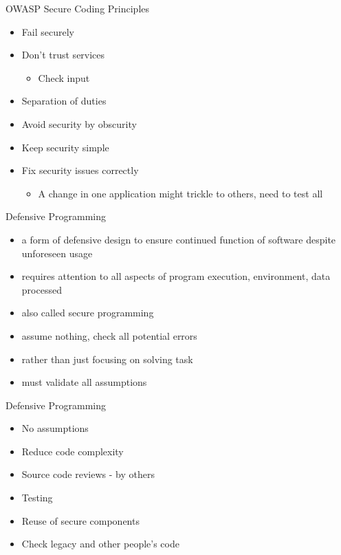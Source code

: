 \documentclass{beamer}
\begin{document}
\begin{frame}{OWASP Secure Coding Principles}
  \begin{itemize}
    \item Fail securely
    \item Don’t trust services
      \begin{itemize}
      \item Check input
      \end{itemize}
    \item Separation of duties
    \item Avoid security by obscurity
    \item Keep security simple
    \item Fix security issues correctly
      \begin{itemize}
      \item A change in one application might trickle to others, need
        to test all
      \end{itemize}
  \end{itemize}
\end{frame}

\begin{frame}{Defensive Programming}
  \begin{itemize}
    \item a form of defensive design to ensure continued
function of software despite unforeseen usage
    \item requires attention to all aspects of program
execution, environment, data processed
    \item also called secure programming
    \item assume nothing, check all potential errors
    \item rather than just focusing on solving task
    \item must validate all assumptions
  \end{itemize}
\end{frame}


\begin{frame}{Defensive Programming}
  \begin{itemize}
  \item No assumptions
  \item Reduce code complexity
  \item Source code reviews - by others
  \item Testing
  \item Reuse of secure components
  \item Check legacy and other people’s code 
  \end{itemize}
\end{frame}
\end{document}
